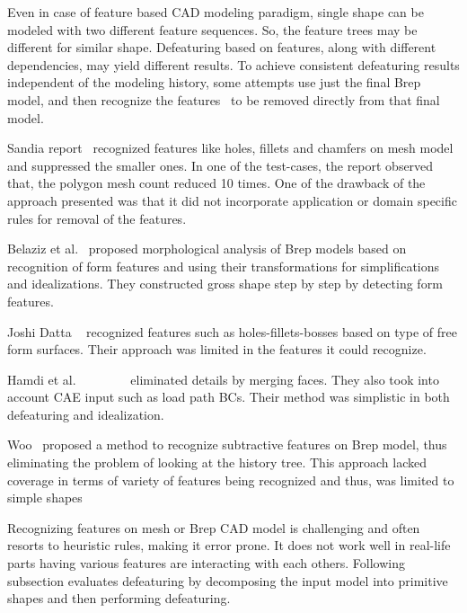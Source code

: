 Even in case of feature based CAD modeling paradigm, single shape can be modeled with two different feature sequences. So, the feature trees may be different for similar shape. Defeaturing based on features, along with different dependencies, may yield different results. To achieve consistent defeaturing results independent of the modeling history, some attempts use just the final Brep model, and then recognize the features~\cite{Woo2009} to be removed directly from that final model.	

Sandia report~\cite{Watterberg1999} recognized features like holes, fillets and chamfers on mesh model and suppressed the smaller ones. In one of the test-cases, the report observed that, the polygon mesh count reduced 10 times. One of the drawback of the approach presented was that it did not incorporate application or domain specific rules for removal of the features.

Belaziz et al.~\cite{BelazizBourasBrun2000} proposed morphological analysis of Brep models based on recognition of form features and using their transformations for simplifications and idealizations. They constructed gross shape step by step by detecting form features. 

Joshi Datta ~\cite{Joshi2003} recognized features such as holes-fillets-bosses based on type of free form surfaces. Their approach was limited in the features it could recognize.

Hamdi et al. ~\cite{Hamdi2005}~\cite{Hamdi2007} ~\cite{Hamdi2009} ~\cite{Hamdi2010}~\cite{Hamdi2012}~\cite{Hamdi2012a} eliminated details by merging faces. They also took into account CAE input such as load path BCs. Their method was simplistic in both defeaturing and idealization.

Woo~\cite{Woo2009} proposed a method to recognize subtractive features on Brep model, thus eliminating the problem of looking at the history tree. This approach lacked coverage in terms of variety of features being recognized and thus, was limited to simple shapes

Recognizing features on mesh or Brep CAD model is challenging and often resorts to heuristic rules, making it error prone. It does not work well in real-life parts having various features are interacting with each others. Following subsection evaluates defeaturing by decomposing the input model into primitive shapes and then performing defeaturing.

